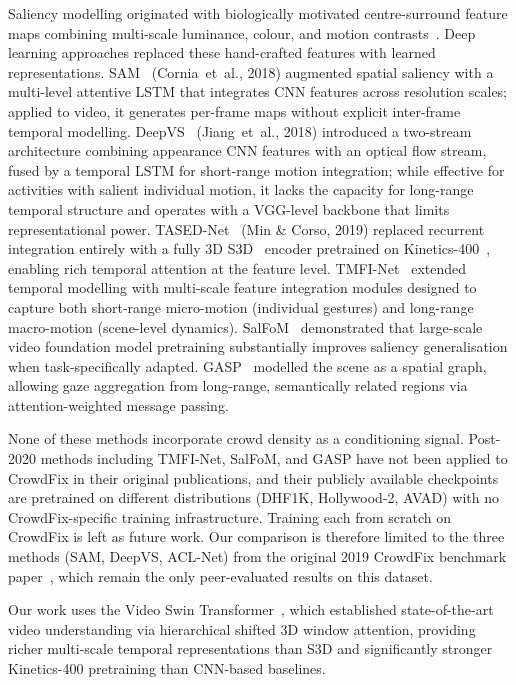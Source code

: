 \documentclass[twocolumn]{article}
\begin{document}
Saliency modelling originated with biologically motivated centre-surround
feature maps combining multi-scale luminance, colour, and motion
contrasts~\citep{itti1998}.  Deep learning approaches replaced these
hand-crafted features with learned representations.
SAM~\citep{sam} (Cornia~et~al., 2018) augmented spatial saliency with a
multi-level attentive LSTM that integrates CNN features across resolution
scales; applied to video, it generates per-frame maps without explicit
inter-frame temporal modelling.  DeepVS~\citep{deepvs} (Jiang~et~al., 2018)
introduced a two-stream architecture combining appearance CNN features with an
optical flow stream, fused by a temporal LSTM for short-range motion
integration; while effective for activities with salient individual motion,
it lacks the capacity for long-range temporal structure and operates with a
VGG-level backbone that limits representational power.  TASED-Net~\citep{tased}
(Min \& Corso, 2019) replaced recurrent integration entirely with a
fully 3D S3D~\citep{s3d} encoder pretrained on Kinetics-400~\citep{kinetics},
enabling rich temporal attention at the feature level.  TMFI-Net~\citep{tmfi_net}
extended temporal modelling with multi-scale feature integration modules
designed to capture both short-range micro-motion (individual gestures) and
long-range macro-motion (scene-level dynamics).  SalFoM~\citep{salfom}
demonstrated that large-scale video foundation model pretraining
substantially improves saliency generalisation when task-specifically adapted.
GASP~\citep{gasp} modelled the scene as a spatial graph, allowing gaze
aggregation from long-range, semantically related regions via attention-weighted
message passing.

None of these methods incorporate crowd density as a conditioning signal.
Post-2020 methods including TMFI-Net, SalFoM, and GASP have not been
applied to CrowdFix in their original publications, and their publicly
available checkpoints are pretrained on different distributions (DHF1K,
Hollywood-2, AVAD) with no CrowdFix-specific training infrastructure.
Training each from scratch on CrowdFix is left as future work.  Our
comparison is therefore limited to the three methods
(SAM, DeepVS, ACL-Net) from the original 2019 CrowdFix benchmark
paper~\citep{aclnet}, which remain the only peer-evaluated
results on this dataset.

Our work uses the Video Swin Transformer~\citep{video_swin}, which
established state-of-the-art video understanding via hierarchical shifted
3D window attention, providing richer multi-scale temporal representations
than S3D and significantly stronger Kinetics-400 pretraining than
CNN-based baselines.
\end{document}
